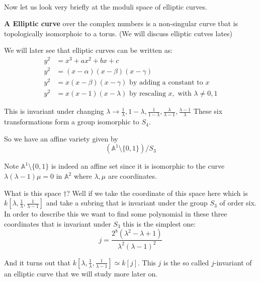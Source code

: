\

Now let us look very briefly at the moduli space of elliptic curves.

\begin{definition}
    \textbf{A Elliptic curve} over the complex numbers is a non-singular curve tbat is topologically isomorphoic to a torus. (We will discuss elliptic cutves lates)
\end{definition}

We will later see that elliptic curves can be written as:\begin{align*}
    y^2&= x^3+ax^2+bx+c\\
    y^2&= (x-\alpha)(x-\beta)(x-\gamma)\\
    y^2 &= x(x-\beta)(x-\gamma) \text{ by adding a constant to }x\\
    y^2 &= x(x-1)(x-\lambda) \text{ by rescaling }x, \text{ with }\lambda\neq 0,1
\end{align*}

This is invariant under changing $\lambda \rightarrow \frac{1}{\lambda}, 1-\lambda, \frac{1}{1-\lambda}, \frac{\lambda}{\lambda-1}, \frac{\lambda - 1}{\lambda}$
These six transformations form a group isomorphic to $S_4$.

So we have an affine variety given by \begin{equation}
    (\mathbb{A}^1\setminus\{0,1\})/S_3 \tag{$\dagger$}
\end{equation}

Note $\mathbb{A}^1\setminus\{0,1\}$ is indeed an affine set since it is isomorphic to the curve $\lambda(\lambda-1)\mu = 0$ in $\mathbb{A}^2$ where $\lambda,\mu$ are coordinates.

What is this space $\dagger$? Well if we take the coordinate of this space here which is $k[\lambda, \frac{1}{\lambda}, \frac{1}{\lambda-1}]$ and take a subring that is invariant under the group $S_3$ of order six. In order to describe this we want to find some polynomial in these three coordinates
that is invariant under $S_3$ this is the simplest one:\begin{equation}
    j = \frac{2^8(\lambda^2-\lambda+1)}{\lambda^2(\lambda-1)^2}
\end{equation}

And it turns out that $k[\lambda, \frac{1}{\lambda}, \frac{1}{\lambda-1}] \simeq k[j]$. This $j$ is the so called $j$-invariant of an elliptic curve that we will study more later on.

